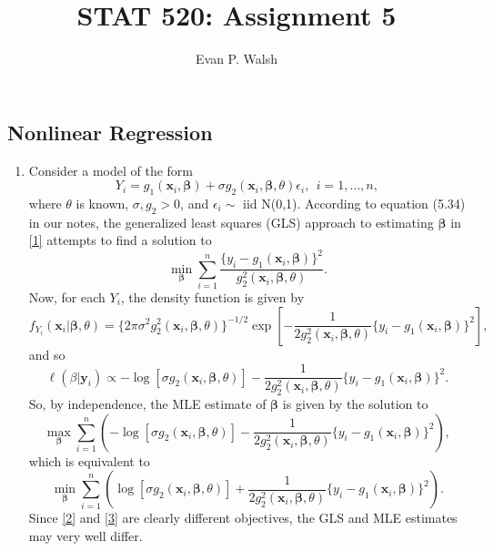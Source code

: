 \documentclass[12pt]{article}
\title{STAT 520: Assignment 5}
\author{Evan P. Walsh}
\begin{document}

\subsection*{Nonlinear Regression}

\begin{enumerate}

  \item Consider a model of the form
    \begin{equation}
      Y_{i} = g_1(\bm{x}_i, \bm{\beta}) + \sigma g_2(\bm{x}_i, \bm{\beta}, \theta) \epsilon_i, \ \ i = 1,\dots, n,
      \label{1}
    \end{equation}
    where $\theta$ is known, $\sigma, g_2 > 0$, and $\epsilon_i \sim$ iid N(0,1). According to equation (5.34) in our notes,
    the generalized least squares (GLS) approach to estimating $\bm{\beta}$ in \eqref{1} attempts to find a solution to
    \begin{equation}
      \min_{\bm{\beta}}\sum_{i=1}^{n}\frac{\{y_i - g_1(\bm{x}_i, \bm{\beta})\}^{2}}{g_{2}^{2}(\bm{x}_i,\bm{\beta},\theta)}.
      \label{2}
    \end{equation}
    Now, for each $Y_{i}$, the density function is given by 
    \[
      f_{Y_i}(\bm{x}_i|\bm{\beta},\theta) = \{2\pi\sigma^{2}g_{2}^{2}(\bm{x}_i,\bm{\beta},\theta)\}^{-1/2}\exp\left[ 
      -\frac{1}{2g_{2}^{2}(\bm{x}_i,\bm{\beta},\theta)}\{y_i - g_1(\bm{x}_i,\bm{\beta})\}^{2}\right],
    \]
    and so
    \[
      \ell(\beta|\bm{y}_i) \propto -\log\left[\sigma g_{2}(\bm{x}_i,\bm{\beta},\theta)\right] - \frac{1}{2g_{2}^{2}(\bm{x}_i,\bm{\beta},\theta)}\{y_i -
      g_{1}(\bm{x}_i,\bm{\beta})\}^{2}.
    \]
    So, by independence, the MLE estimate of $\bm{\beta}$ is given by the solution to 
    \[
      \max_{\bm{\beta}}\sum_{i=1}^{n}\left(-\log\left[\sigma g_{2}(\bm{x}_i,\bm{\beta},\theta)\right] - \frac{1}{2g_{2}^{2}(\bm{x}_i,\bm{\beta},\theta)}\{y_i -
      g_{1}(\bm{x}_i,\bm{\beta})\}^{2}\right),
    \]
    which is equivalent to
    \begin{equation}
      \min_{\bm{\beta}}\sum_{i=1}^{n}\left(\log\left[\sigma g_{2}(\bm{x}_i,\bm{\beta},\theta)\right] + \frac{1}{2g_{2}^{2}(\bm{x}_i,\bm{\beta},\theta)}\{y_i -
      g_{1}(\bm{x}_i,\bm{\beta})\}^{2}\right).
      \label{3}
    \end{equation}
    Since \eqref{2} and \eqref{3} are clearly different objectives, the GLS and MLE estimates may very well differ.



\end{enumerate}
\end{document}

